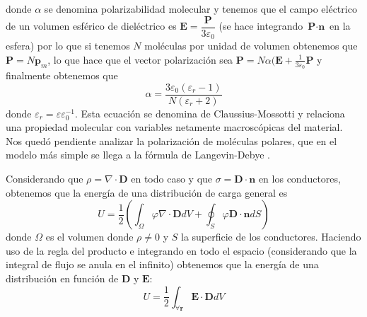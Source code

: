 \documentclass[11pt,a4paper]{article}
\numberwithin{equation}{section}
\begin{document}
    donde $\alpha$ se denomina polarizabilidad molecular y tenemos que el campo eléctrico de un volumen esférico de dieléctrico es $\textbf{E} = \dfrac{\textbf{P}}{3\varepsilon_0}$ (se hace integrando $\textbf{P}\cdot\textbf{n}$ en la esfera) por lo que si tenemos $N$ moléculas por unidad de volumen obtenemos que $\textbf{P} = N \textbf{p}_m$, lo que hace que el vector polarización sea $\textbf{P} = N \alpha(\textbf{E} + \frac{1}{3\varepsilon_0} \textbf{P}$ y finalmente obtenemos que
    \begin{equation}
        \alpha = \frac{3 \varepsilon_0 (\varepsilon_r - 1)}{N(\varepsilon_r +2)}
        \label{eq:e_claussius_mossotti}
    \end{equation}
    donde $\varepsilon_r = \varepsilon \varepsilon_0^{-1}$. Esta ecuación se denomina de Claussius-Mossotti y relaciona una propiedad molecular con variables netamente macroscópicas del material.
    Nos quedó pendiente analizar la polarización de moléculas polares, que en el modelo más simple se llega a la fórmula de Langevin-Debye \cite[p.~132]{reitz}. 
    
    Considerando que $\rho = \nabla \cdot \textbf{D}$ en todo caso y que $\sigma = \textbf{D} \cdot \textbf{n}$ en los conductores, obtenemos que la energía de una distribución de carga general es
    \begin{equation}
        U = \frac{1}{2} \left(\int_{\Omega} \varphi \nabla \cdot \textbf{D} dV + \oint_{S} \varphi \textbf{D} \cdot \textbf{n} dS\right)
        \label{eq:e_energia_general}
    \end{equation}
    donde $\Omega$ es el volumen donde $\rho \neq 0$ y $S$ la superficie de los conductores. Haciendo uso de la regla del producto e integrando en todo el espacio (considerando que la integral de flujo se anula en el infinito) obtenemos que la energía de una distribución en función de $\textbf{D}$ y $\textbf{E}$:
    \begin{equation}
        U = \frac{1}{2} \int_{\forall \textbf{r}} \textbf{E} \cdot \textbf{D} dV
        \label{eq:e_energia_general_campo}
    \end{equation}
\end{document}
